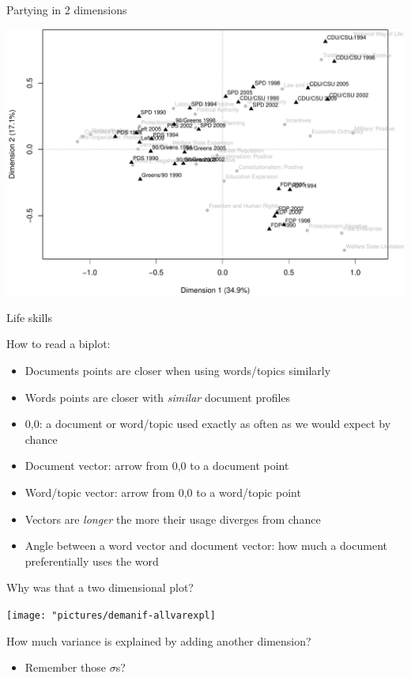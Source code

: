 \documentclass{hertieteaching}
\begin{document}
\begin{frame}{Partying in 2 dimensions}

\centerline{\includegraphics[scale=0.5]{pictures/grey-just-rile-crop}}

\end{frame}
\begin{frame}{Life skills}

How to read a biplot:
\begin{itemize}
  \item Documents points are closer when using words/topics similarly
  \item Words points are closer with \textit{similar} document profiles
  \item 0,0: a document or word/topic used exactly as often as we would expect by chance
  \item Document vector: arrow from 0,0 to a document point
  \item Word/topic vector: arrow from 0,0 to a word/topic point
  \item Vectors are \textit{longer} the more their usage diverges from chance
  \item Angle between a word vector and document vector: how much a
    document preferentially uses the word
\end{itemize}


\end{frame}
\begin{frame}{Why was that a two dimensional plot?}

\bigskip
\centerline{\texttt{[image: "pictures/demanif-allvarexpl]}}

How much variance is explained by adding another dimension?
\begin{itemize}
  \item Remember those $\sigma$s?
\end{itemize}

\end{frame}
\end{document}
